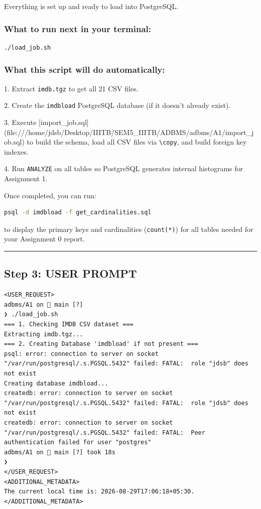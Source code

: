 \documentclass[11pt,a4paper]{article}
\begin{document}
Everything is set up and ready to load into PostgreSQL.


\subsubsection{What to run next in your terminal:}

\begin{lstlisting}[language=bash]
./load_job.sh
\end{lstlisting}


\subsubsection{What this script will do automatically:}
1. Extract \texttt{imdb.tgz} to get all 21 CSV files.

2. Create the \texttt{imdbload} PostgreSQL database (if it doesn't already exist).

3. Execute [import\_job.sql](file:///home/jdsb/Desktop/IIITB/SEM5\_IIITB/ADBMS/adbms/A1/import\_job.sql) to build the schema, load all CSV files via \texttt{\textbackslash{}copy}, and build foreign key indexes.

4. Run \texttt{ANALYZE} on all tables so PostgreSQL generates internal histograms for Assignment 1.


Once completed, you can run:

\begin{lstlisting}[language=bash]
psql -d imdbload -f get_cardinalities.sql
\end{lstlisting}

to display the primary keys and cardinalities (\texttt{count(*)}) for all tables needed for your Assignment 0 report.


\hrule

\subsection{Step 3: USER PROMPT}

\begin{lstlisting}[language=text]
<USER_REQUEST>
adbms/A1 on 🌱 main [?] 
❯ ./load_job.sh
=== 1. Checking IMDB CSV dataset ===
Extracting imdb.tgz...
=== 2. Creating Database 'imdbload' if not present ===
psql: error: connection to server on socket "/var/run/postgresql/.s.PGSQL.5432" failed: FATAL:  role "jdsb" does not exist
Creating database imdbload...
createdb: error: connection to server on socket "/var/run/postgresql/.s.PGSQL.5432" failed: FATAL:  role "jdsb" does not exist
createdb: error: connection to server on socket "/var/run/postgresql/.s.PGSQL.5432" failed: FATAL:  Peer authentication failed for user "postgres"
adbms/A1 on 🌱 main [?] took 18s 
❯ 
</USER_REQUEST>
<ADDITIONAL_METADATA>
The current local time is: 2026-08-29T17:06:18+05:30.
</ADDITIONAL_METADATA>
\end{lstlisting}
\end{document}
